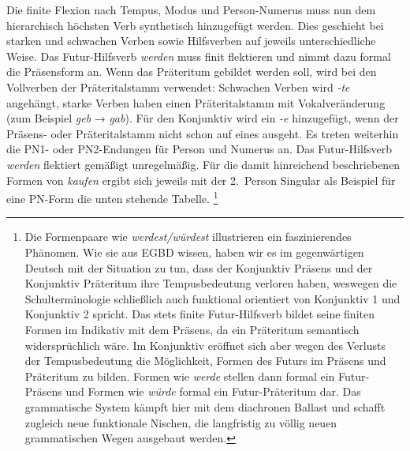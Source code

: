 Die finite Flexion nach Tempus, Modus und Person-Numerus muss nun dem hierarchisch höchsten Verb synthetisch hinzugefügt werden.
Dies geschieht bei starken und schwachen Verben sowie Hilfsverben auf jeweils unterschiedliche Weise.
Das Futur-Hilfsverb \textit{werden} muss finit flektieren und nimmt dazu formal die Präsensform an.
Wenn das Präteritum gebildet werden soll, wird bei den Vollverben der Präteritalstamm verwendet: Schwachen Verben wird \textit{-te} angehängt, starke Verben haben einen Präteritalstamm mit Vokalveränderung (zum Beispiel \textit{geb} → \textit{gab}).
Für den Konjunktiv wird ein \textit{-e} hinzugefügt, wenn der Präsens- oder Präteritalstamm nicht schon auf eines ausgeht.
Es treten weiterhin die PN1- oder PN2-Endungen für Person und Numerus an.
Das Futur-Hilfsverb \textit{werden} flektiert gemäßigt unregelmäßig.
Für die damit hinreichend beschriebenen Formen von \textit{kaufen} ergibt sich jeweils mit der 2.~Person Singular als Beispiel für eine PN-Form die unten stehende Tabelle.%
\footnote{Die Formenpaare wie \textit{werdest\slash würdest} illustrieren ein faszinierendes Phänomen.
Wie sie aus EGBD wissen, haben wir es im gegenwärtigen Deutsch mit der Situation zu tun, dass der Konjunktiv Präsens und der Konjunktiv Präteritum ihre Tempusbedeutung verloren haben, weswegen die Schulterminologie schließlich auch funktional orientiert von Konjunktiv 1 und Konjunktiv 2 spricht.
Das stets finite Futur-Hilfsverb bildet seine finiten Formen im Indikativ mit dem Präsens, da ein Präteritum semantisch widersprüchlich wäre.
Im Konjunktiv eröffnet sich aber wegen des Verlusts der Tempusbedeutung die Möglichkeit, Formen des Futurs im Präsens und Präteritum zu bilden.
Formen wie \textit{werde} stellen dann formal ein Futur-Präsens und Formen wie \textit{würde} formal ein Futur-Präteritum dar.
Das grammatische System kämpft hier mit dem diachronen Ballast und schafft zugleich neue funktionale Nischen, die langfristig zu völlig neuen grammatischen Wegen ausgebaut werden.}

